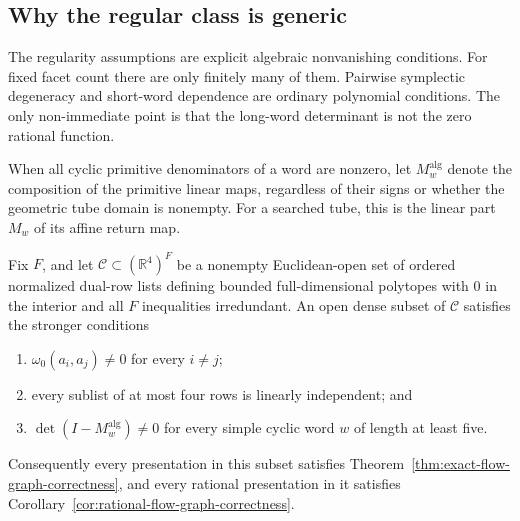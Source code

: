 \subsection{Why the regular class is generic}
\label{subsec:flow-graph-algorithm-ch2021-genericity}

The regularity assumptions are explicit algebraic nonvanishing conditions.
For fixed facet count there are only finitely many of them.  Pairwise
symplectic degeneracy and short-word dependence are ordinary polynomial
conditions.  The only non-immediate point is that the long-word determinant is
not the zero rational function.

When all cyclic primitive denominators of a word are nonzero, let
\(M_w^{\mathrm{alg}}\) denote the composition of the primitive linear maps,
regardless of their signs or whether the geometric tube domain is nonempty.
For a searched tube, this is the linear part \(M_w\) of its affine return map.

\begin{proposition}
\label{prop:flow-graph-presentation-chamber-genericity}
Fix \(F\), and let \(\mathcal C\subset(\mathbb R^4)^F\) be a nonempty
Euclidean-open set of ordered normalized dual-row lists defining bounded
full-dimensional polytopes with \(0\) in the interior and all \(F\)
inequalities irredundant.  An open dense subset of \(\mathcal C\) satisfies
the stronger conditions
\begin{enumerate}
  \item \(\omega_0(a_i,a_j)\ne0\) for every \(i\ne j\);
  \item every sublist of at most four rows is linearly independent; and
  \item \(\det(I-M_w^{\mathrm{alg}})\ne0\) for every simple cyclic word \(w\)
    of length at least five.
\end{enumerate}
Consequently every presentation in this subset satisfies
Theorem~\ref{thm:exact-flow-graph-correctness}, and every rational presentation
in it satisfies Corollary~\ref{cor:rational-flow-graph-correctness}.
\end{proposition}


